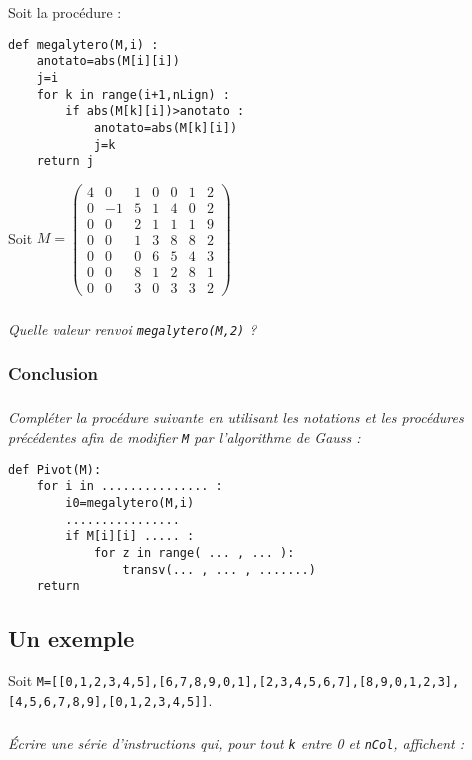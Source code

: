 \documentclass[10pt,oneside]{article}
\begin{document}
\setlength{\columnseprule}{.2pt}

Soit la procédure :

\begin{minipage}[c]{.47\linewidth}
\begin{verbatim}
def megalytero(M,i) :
    anotato=abs(M[i][i])
    j=i
    for k in range(i+1,nLign) :
        if abs(M[k][i])>anotato :
            anotato=abs(M[k][i])
            j=k
    return j
\end{verbatim}
\end{minipage}\hfill
\begin{minipage}[c]{.47\linewidth}
 Soit $M = \begin{pmatrix}
4&0&1&0&0&1&2\\0&-1&5&1&4&0&2\\0&0&2&1&1&1&9\\0&0&1&3&8&8&2\\0&0&0&6&5&4&3\\0&0&8&1&2&8&1\\0&0&3&0&3&3&2 \end{pmatrix}$
\end{minipage}

\subparagraph{}
\textit{Quelle valeur renvoi  \texttt{megalytero(M,2)} ?}



\subsubsection*{Conclusion}


\subparagraph{}
\textit{Compléter la procédure suivante en utilisant les notations et les procédures précédentes afin de modifier \texttt{M} par l'algorithme de Gauss :}
%
\begin{verbatim}
def Pivot(M):
    for i in ............... :
        i0=megalytero(M,i)
        ................
        if M[i][i] ..... : 
            for z in range( ... , ... ):
                transv(... , ... , .......)
    return
\end{verbatim}

\subsection*{Un exemple}




Soit \texttt{M=[[0,1,2,3,4,5],[6,7,8,9,0,1],[2,3,4,5,6,7],[8,9,0,1,2,3],[4,5,6,7,8,9],[0,1,2,3,4,5]]}.

\subparagraph{}
\textit{Écrire une série d'instructions qui, pour tout \texttt{k} entre 0 et \texttt{nCol}, affichent :}
\end{document}
